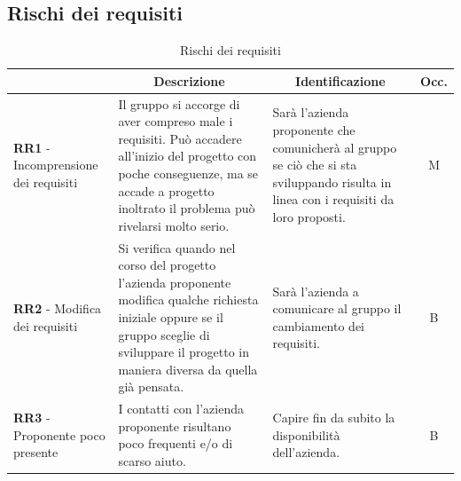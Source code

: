 \subsection{Rischi dei requisiti} \label{subsection:rischi_requisiti}
\begin{table}[H]
  \centering
  \renewcommand{\arraystretch}{1.8}
  \begin{tabular}{p{5.5cm}|p{5cm}|p{5cm}|c}
    \rowcolor[HTML]{125E28} 
    \multicolumn{1}{c}{\color[HTML]{FFFFFF}\textbf{Codice}}
    & \multicolumn{1}{c}{\color[HTML]{FFFFFF}\textbf{Descrizione}}
    & \multicolumn{1}{c}{\color[HTML]{FFFFFF}\textbf{Identificazione}}
    & \color[HTML]{FFFFFF}\textbf{Occ.}\\
    \hline
    \textbf{RR1} - Incomprensione dei requisiti & Il gruppo si accorge di aver compreso male i requisiti. Può accadere all'inizio del progetto con poche conseguenze, ma se accade a progetto inoltrato il problema può rivelarsi molto serio. & Sarà l'azienda proponente che comunicherà al gruppo se ciò che si sta sviluppando risulta in linea con i requisiti da loro proposti. & M \\
    \textbf{RR2} - Modifica dei requisiti & Si verifica quando nel corso del progetto l'azienda proponente modifica qualche richiesta iniziale oppure se il gruppo sceglie di sviluppare il progetto in maniera diversa da quella già pensata. & Sarà l'azienda a comunicare al gruppo il cambiamento dei requisiti. & B \\
    \textbf{RR3} - Proponente poco presente & I contatti con l'azienda proponente risultano poco frequenti e/o di scarso aiuto. & Capire fin da subito la disponibilità dell'azienda. & B \\
  \end{tabular}
  \caption{Rischi dei requisiti}
\end{table}

\pagebreak
